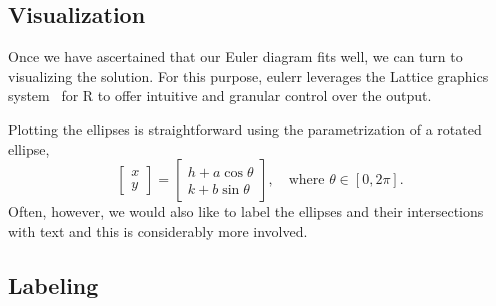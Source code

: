 \documentclass[
  oneside,
  usegeometry,
  numbers=noendperiod,
  openany,
  parskip=half
]{scrbook}\usepackage[]{graphicx}\usepackage{xcolor}
\newcommand{\pkg}[1]{{\fontseries{b}\selectfont #1}}
\begin{document}
\begin{appendices}
\chapter{Visualization}

Once we have ascertained that our Euler diagram fits well, we can turn to visualizing the solution. For this purpose, \pkg{eulerr} leverages the \pkg{Lattice} graphics system~\citep{sarkar_2008} for R to offer intuitive and granular control over the output.

Plotting the ellipses is straightforward using the parametrization of a rotated ellipse,
%
\begin{equation*}
\begin{bmatrix}
  x \\ y
\end{bmatrix} =
\begin{bmatrix}
  h + a \cos{\theta} \\
  k + b \sin{\theta}
\end{bmatrix},\quad \text{where } \theta \in [0, 2\pi].
\end{equation*}
%
Often, however, we would also like to label the ellipses and their intersections with text and this is considerably more involved.

\section{Labeling}
\label{sec:labeling}


\end{appendices}
\end{document}
